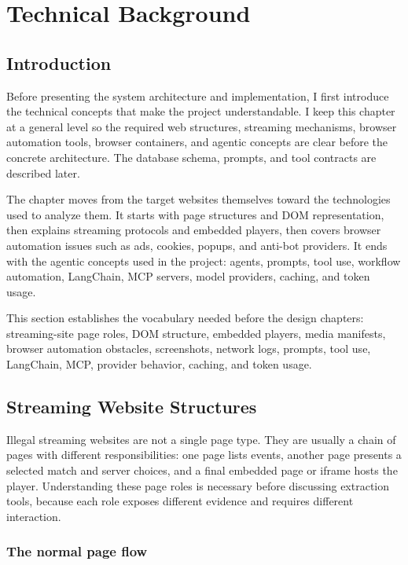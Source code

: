 \chapter{Technical Background}

\section{Introduction}

Before presenting the system architecture and implementation, I first introduce the
technical concepts that make the project understandable. I keep this chapter at a
general level so the required web structures, streaming mechanisms, browser automation
tools, browser containers, and agentic concepts are clear before the concrete
architecture.
The database schema, prompts, and tool contracts are described later.

The chapter moves from the target websites themselves toward the technologies used to
analyze them. It starts with page structures and DOM representation, then explains
streaming protocols and embedded players, then covers browser automation issues such as
ads, cookies, popups, and anti-bot providers. It ends with the agentic concepts used in
the project: agents, prompts, tool use, workflow automation, LangChain, MCP servers, model providers,
caching, and token usage.

This section establishes the vocabulary needed before the design chapters:
streaming-site page roles, DOM structure, embedded players, media
manifests, browser automation obstacles, screenshots, network logs, prompts, tool use,
LangChain, MCP, provider behavior, caching, and token usage.

\section{Streaming Website Structures}

Illegal streaming websites are not a single page type. They are usually a chain of
pages with different responsibilities: one page lists events, another page presents a
selected match and server choices, and a final embedded page or iframe hosts the player.
Understanding these page roles is necessary before discussing extraction tools, because
each role exposes different evidence and requires different interaction.

\subsection{The normal page flow}

